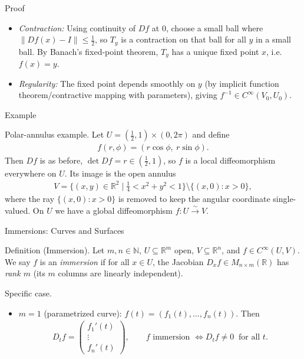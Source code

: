 \begin{frame}{Proof}
\begin{itemize}
\item \emph{Contraction:} Using continuity of $Df$ at $0$, choose a small ball where $\|Df(x)-I\|\le \frac12$, so $T_y$ is a contraction on that ball for all $y$ in a small ball. By Banach’s fixed-point theorem, $T_y$ has a unique fixed point $x$, i.e.\ $f(x)=y$.
\item \emph{Regularity:} The fixed point depends smoothly on $y$ (by implicit function theorem/contractive mapping with parameters), giving $f^{-1}\in C^\infty(V_0,U_0)$.
\end{itemize}
\end{frame}

\begin{frame}{Example}
\begin{block}{Polar-annulus example.} Let $U=(\frac{1}{2},1)\times(0,2\pi)$ and define
\begin{align*}
f(r,\phi)=(r\cos\phi,\ r\sin\phi).
\end{align*}
Then $D f$ is as before, $\det D f=r\in(\frac{1}{2},1)$, so $f$ is a local diffeomorphism everywhere on $U$.
Its image is the open annulus
\begin{align*}
V=\{(x,y)\in\mathbb{R}^2\mid \tfrac14<x^2+y^2<1\}\setminus\{(x,0):x>0\},
\end{align*}
where the ray $\{(x,0):x>0\}$ is removed to keep the angular coordinate single-valued. On $U$ we have a global diffeomorphism $f:U\overset{\sim}{\longrightarrow} V$.

\end{block}
\end{frame}


\begin{frame}{Immersions: Curves and Surfaces}
\begin{block}{Definition (Immersion).}
Let $m,n\in\mathbb{N}$, $U\subseteq\mathbb{R}^m$ open, $V\subseteq\mathbb{R}^n$, and $f\in C^\infty(U,V)$.
We say $f$ is an \emph{immersion} if for all $x\in U$, the Jacobian $D_x f\in M_{n\times m}(\mathbb{R})$ has \emph{rank $m$} (its $m$ columns are linearly independent).
\end{block}

\begin{block}{Specific case.}
\begin{itemize}
\item $m=1$ (parametrized curve): $f(t)=(f_1(t),\dots,f_n(t))$. Then
\begin{align*}
D_t f = \begin{pmatrix} f_1'(t)\\ \vdots\\ f_n'(t)\end{pmatrix},
\qquad
f \text{ immersion } \Leftrightarrow D_t f \neq 0 \ \text{ for all } t.
\end{align*}
\end{itemize}
\end{block}
\end{frame}

